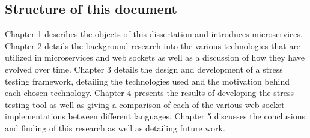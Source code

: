\subsection{Structure of this document}

Chapter 1 describes the objects of this dissertation and introduces microservices. Chapter 2 details the background research into the various technologies that are utilized in microservices and web sockets as well as a discussion of how they have evolved over time. Chapter 3 details the design and development of a stress testing framework, detailing the technologies used and the motivation behind each chosen technology. Chapter 4 presents the results of developing the stress testing tool as well as giving a comparison of each of the various web socket implementations between different languages. Chapter 5 discusses the conclusions and finding of this research as well as detailing future work.